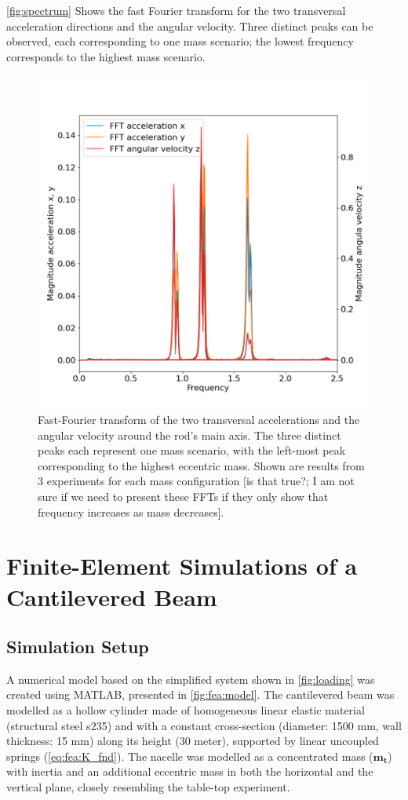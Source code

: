 \documentclass{article}
\begin{document}
\autoref{fig:spectrum} Shows the fast Fourier transform for the two transversal acceleration directions and the angular velocity. Three distinct peaks can be observed, each corresponding to one mass scenario; the lowest frequency corresponds to the highest mass scenario. 

\begin{figure}[ht]
    \centering
    \includegraphics[width=0.5\linewidth]{../results/experiment/spectrum.png}
    \caption{Fast-Fourier transform of the two transversal accelerations and the angular velocity around the rod's main axis. The three distinct peaks each represent one mass scenario, with the left-most peak corresponding to the highest eccentric mass. Shown are results from 3 experiments for each mass configuration [is that true?; I am not sure if we need to present these FFTs if they only show that frequency increases as mass decreases].}
    \label{fig:spectrum}
\end{figure}

\clearpage

\section{Finite-Element Simulations of a Cantilevered Beam}
\label{sec:simulations}

\subsection{Simulation Setup}

A numerical model based on the simplified system shown in \autoref{fig:loading} was created using MATLAB, presented in \autoref{fig:fea:model}. The cantilevered beam was modelled as a hollow cylinder made of  homogeneous linear elastic material (structural steel s235) and with a constant cross-section (diameter: 1500 mm, wall thickness: 15 mm) along its height (30 meter), supported by linear uncoupled springs (\autoref{eq:fea:K_fnd}).  The nacelle was modelled as a concentrated mass ($\mathbf{m_{t}}$) with inertia and an additional eccentric mass in both the horizontal and the vertical plane, closely resembling the table-top experiment.
\end{document}
